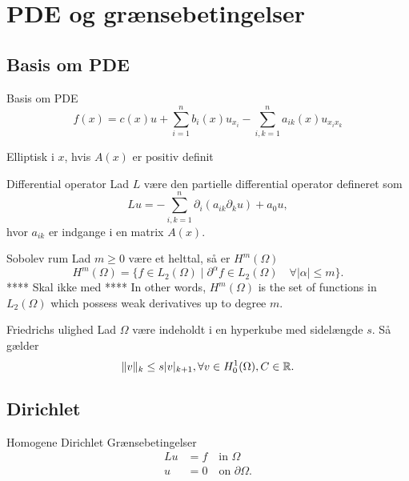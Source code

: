 
\section{PDE og grænsebetingelser}
\subsection{Basis om PDE}
\begin{frame}{Basis om PDE}{}
    \begin{equation*}
        f(x) = c(x) u + \sum_{i=1}^{n}b_i(x)u_{x_{i}}
       - \sum_{i,k=1}^{n}a_{ik}(x)u_{x_i x_k}
   \end{equation*}    

   Elliptisk i $x$, hvis $A(x)$ er positiv definit
\end{frame}

\begin{frame}{Differential operator}{}
    Lad $L$ være den partielle differential operator defineret som
    \begin{equation}
        Lu = - \sum_{i,k=1}^n \partial_i(a_{ik} \partial_k u)+ a_0u,
    \end{equation}
    hvor $a_{ik}$ er indgange i en matrix $A(x)$.
\end{frame}

\begin{frame}{Sobolev rum}{}
    Lad $m \geq 0$ være et helttal, så er $H^m(\Omega)$
    \begin{equation*}
        H^m(\Omega) = \{  f \in L_2(\Omega) \mid \partial ^{\alpha}f \in 
        L_2(\Omega) \quad \forall |\alpha| \leq m  \}.
    \end{equation*}
    **** Skal ikke med ****
    In other words, $H^m(\Omega)$ is the set of functions in $L_2(\Omega)$ 
    which possess weak derivatives up to degree $m$.
\end{frame}

\begin{frame}{Friedrichs ulighed}{}
    Lad $\Omega$ være indeholdt i en hyperkube med sidelængde $s$. Så gælder
    \begin{equation*}
        \| v \|_{k} \leq s |v|_{k+1}, \forall v \in H_0^1(\Omega), C \in \mathbb{R}.
    \end{equation*}
\end{frame}

\subsection{Dirichlet}
\begin{frame}{Homogene Dirichlet Grænsebetingelser}{}
    \begin{align*}
        Lu &= f \quad \text{in } \Omega\\
        u &= 0 \quad \text{on } \partial \Omega.
    \end{align*}
\end{frame}

